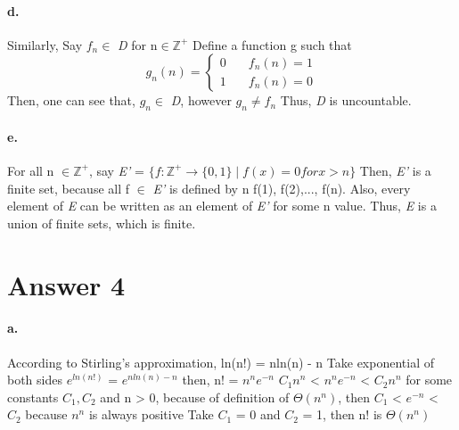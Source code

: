 \documentclass[11pt]{article}
\begin{document}
\paragraph{d.} Similarly, Say $f_n \in$ \emph{D} for n$\in \mathbb{Z}^+$ Define a function g such that
$$
g_n(n) = \left\{
        \begin{array}{ll}
            0 & \quad f_n(n) = 1 \\
            1 & \quad f_n(n) = 0
        \end{array}
    \right.
$$
Then, one can see that, $g_n \in$ \emph{D}, however $g_n \neq f_n$ \newline
Thus, \emph{D} is uncountable.

\paragraph{e.} For all n $\in \mathbb{Z}^+$, say \emph{E'} = $\{f: \mathbb{Z}^+ \rightarrow \{0,1\} \mid f(x) = 0 for x > n\}$ \newline
Then, \emph{E'} is a finite set, because all f $\in$ \emph{E'} is defined by n f(1), f(2),..., f(n). Also, every element of \emph{E} can be written as an element of \emph{E'} for some n value. Thus, \emph{E} is a union of finite sets, which is finite.

\section*{Answer 4}
\paragraph{a.} According to Stirling's approximation, ln(n!) = nln(n) - n \newline \newline
Take exponential of both sides $e^{ln(n!)}$ = $e^{nln(n)-n}$ then, \newline
n! = $n^ne^{-n}$ \newline
$C_1n^n$ < $n^ne^{-n}$ < $C_2n^n$ for some constants $C_1,C_2$ and n > 0, because of definition of $\Theta(n^n)$, then \newline
$C_1$ < $e^{-n}$ < $C_2$ because $n^n$ is always positive \newline
Take $C_1$ = 0 and $C_2$ = 1, then n! is $\Theta(n^n)$
\end{document}
